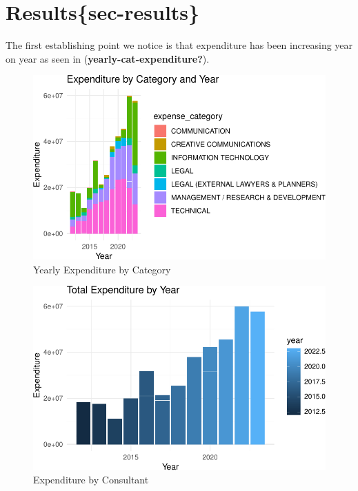 \documentclass[
  letterpaper,
  DIV=11,
  numbers=noendperiod]{scrartcl}
\begin{document}
\section{Results\{sec-results\}}\label{resultssec-results}

The first establishing point we notice is that expenditure has been
increasing year on year as seen in (\textbf{yearly-cat-expenditure?}).

\begin{figure}[H]

{\centering \includegraphics{paper_files/figure-pdf/yearly-cat-expenditure-1.pdf}

}

\caption{Yearly Expenditure by Category}

\end{figure}%

\begin{figure}[H]

{\centering \includegraphics{paper_files/figure-pdf/top-consultants-1.pdf}

}

\caption{Expenditure by Consultant}

\end{figure}%
\end{document}
